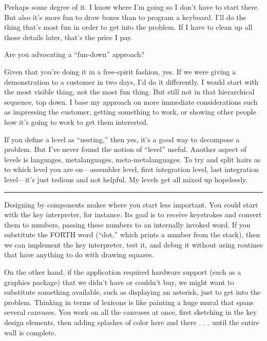 \begin{tfquot}
	Perhaps some degree of it. I know where I'm going so I don't
	have to start there. But also it's more fun to draw boxes than
	to program a keyboard. I'll do the thing that's most fun in
	order to get into the problem. If I have to clean up all those
	details later, that's the price I pay.
\end{tfquot}

\noindent Are you advocating a ``fun-down'' approach?

\begin{tfquot}
	Given that you're doing it in a free-spirit fashion, yes. If
	we were giving a demonstration to a customer in two days, I'd
	do it differently. I would start with the most visible thing,
	not the most fun thing. But still not in that hierarchical
	sequence, top down. I base my approach on more immediate
	considerations such as impressing the customer, getting
	something to work, or showing other people how it's going to
	work to get them interested.

	If you define a level as ``nesting,'' then yes, it's a good
	way to decompose a problem. But I've never found the notion of
	``level'' useful. Another aspect of levels is languages,
	metalanguages, meta-metalanguages. To try and split hairs as
	to which level you are on---assembler level, first integration
	level, last integration level---it's just tedious and not
	helpful. My levels get all mixed up hopelessly.
\end{tfquot}
\hrule height 1pt\hspace{1ex}

Designing by components makes where you start less important. You
could start with the key interpreter, for instance. Its goal is to
receive keystrokes and convert them to numbers, passing these numbers
to an internally invoked word. If you substitute the FORTH word
 (``dot,'' which prints a number from the stack), then we can
implement the key interpreter, test it, and debug it without using
routines that have anything to do with drawing squares.

On the other hand, if the application required hardware support
(such as a graphics package) that we didn't have or couldn't buy, we
might want to substitute something available, such as displaying an
asterisk, just to get into the problem. Thinking in terms of lexicons is like
painting a huge mural that spans several canvases. You work on all the
canvases at once, first sketching in the key design elements, then adding
splashes of color here and there . . . until the entire wall is complete.

